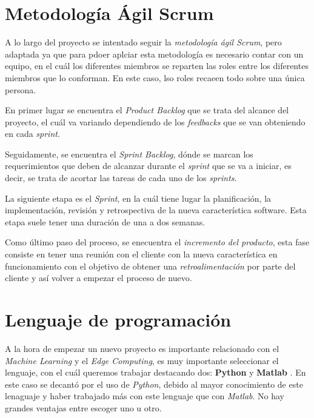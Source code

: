 
\section{Metodología Ágil Scrum}\label{scrum}
A lo largo del proyecto se intentado seguir la \textit{metodología ágil Scrum}, pero adaptada ya que para pdoer aplciar esta metodología es necesario contar con un equipo, en el cuál los diferentes miembros se reparten las roles entre los diferentes miembros que lo conforman. En este caso, lso roles recaeen todo sobre una única persona.


En primer lugar se encuentra el \textit{Product Backlog} \cite{scrum} que se trata del alcance del proyecto, el cuál va variando dependiendo de los \textit{feedbacks} que se van obteniendo en cada \textit{sprint}.

Seguidamente, se encuentra el \textit{Sprint Backlog}, dónde se marcan los requerimientos que deben de alcanzar durante el \textit{sprint} que se va a iniciar, es decir, se trata de acortar las tareas de cada uno 
de los \textit{sprints}.

La siguiente etapa es el \textit{Sprint}, en la cuál tiene lugar la planificación, la implementación, revisión y retrospectiva de la nueva característica software.
Esta etapa suele tener una duración de una a dos semanas.

Como último paso del proceso, se enecuentra el \textit{incremento del producto}, esta fase consiste en tener una reunión con el cliente con la nueva característica en funcionamiento con el objetivo de obtener una \textit{retroalimentación} por parte del cliente y así volver a empezar el proceso de nuevo.


\section{Lenguaje de programación}
A la hora de empezar un nuevo proyecto es importante relacionado con el \textit{Machine Learning} y el \textit{Edge Computing}, es muy importante seleccionar el lenguaje, con el cuál queremos trabajar destacando dos: \textbf{Python} \cite{python} y \textbf{Matlab} \cite{matlab}.
En este caso se decantó por el uso de \textit{Python}, debido al mayor conocimiento de este lenaguaje y haber trabajado más con este lenguaje que con \textit{Matlab}.
No hay grandes ventajas entre escoger uno u otro.

